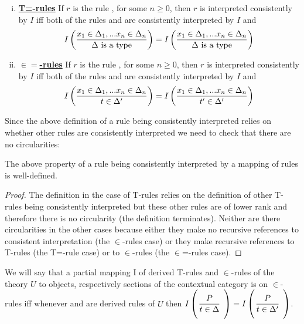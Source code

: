 \begin{numbereddefinition}
\begin{enumerate}[(i)]
\item \underline{\textbf{T=-rules}} 
If $r$ is the rule  , for some $n \geq 0$, 
then $r$ is interpreted consistently by $I$ iff
both of the rules \ZDelta and \ZDeltap
are consistently interpreted by $I$ and
$$
I\left(\frac{x_1 \in \Delta_1,... x_{n} \in \Delta_{n}}{\Delta\mbox{ is a type}}\right) = I\left(\frac{x_1 \in \Delta_1,... x_{n} \in \Delta_{n}}{\Delta\mbox{ is a type}}\right)
$$
 
\item \underline{\textbf{$\in=$-rules}} 
If $r$ is the rule  , for some $n \geq 0$, 
then $r$ is interpreted consistently by $I$ iff
both of the rules \ZtDelta and 
are consistently interpreted by $I$ and
$$
I\left(\frac{x_1 \in \Delta_1,... x_{n} \in \Delta_{n}}{t \in \Delta'}\right) = I\left(\frac{x_1 \in \Delta_1,... x_{n} \in \Delta_{n}}{t' \in \Delta'}\right)
$$
\end{enumerate}
\end{numbereddefinition}


Since the above definition of a rule being consistently interpreted relies on whether other rules are consistently interpreted we need to check that there are no circularities:
\begin{lemma}
The above property of a rule being consistently interpreted by a mapping of rules is well-defined. 
\end{lemma}
\begin{proof}
The definition in the case of T-rules relies on the definition of other T-rules being consistently interpreted but these other rules are of lower rank and therefore there is no circularity 
(the definition terminates).
Neither are there circularities in the other cases because either they make no recursive references to consistent interpretation (the $\in$-rules case)
or they make recursive references to T-rules (the T=-rule case) or to $\in$-rules (the $\in$=-rules case).
\end{proof}

\begin{definition}
We will say that a partial mapping I  
of derived T-rules and $\in$-rules of the theory $U$ to objects, respectively sections of the contextual category \catcw
is  on   $\in$-rules iff whenever
 and  are derived rules of $U$ then 
$\Imap{\gatdisplayrule{P}{\ofT{t}{\Delta}}}=\Imap{\gatdisplayrule{P}{\ofT{t}{\Delta'}}}$.
\end{definition}

